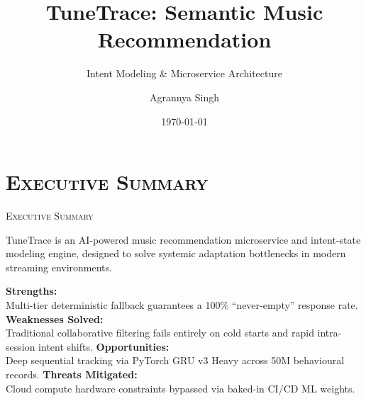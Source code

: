 \documentclass[xcolor=dvipsnames, aspectratio=1610]{beamer}
\title[TuneTrace]{TuneTrace: Semantic Music Recommendation}
\subtitle{Intent Modeling \& Microservice Architecture}
\author[A. Singh]{Agrannya Singh}
\institute[VIT]{VIT Vellore}
\date{\today}
\begin{document}
\begin{frame}[plain]
  \slatetitlepage
\end{frame}

\section{\textsc{Executive Summary}}
\begin{frame}{\textsc{Executive Summary}}

  TuneTrace is an AI-powered music recommendation microservice and intent-state modeling engine, designed to solve systemic adaptation bottlenecks in modern streaming environments.

  \vspace{5mm}
  \swot
    {\scriptsize \textbf{Strengths:} \\ Multi-tier deterministic fallback guarantees a 100\% ``never-empty'' response rate.}
    {\scriptsize \textbf{Weaknesses Solved:} \\ Traditional collaborative filtering fails entirely on cold starts and rapid intra-session intent shifts.}
    {\scriptsize \textbf{Opportunities:} \\ Deep sequential tracking via PyTorch GRU v3 Heavy across 50M behavioural records.}
    {\scriptsize \textbf{Threats Mitigated:} \\ Cloud compute hardware constraints bypassed via baked-in CI/CD ML weights.}

\end{frame}

\end{document}
